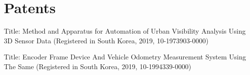 \section{Patents}

\vspace{1mm}
\begin{pubSubsectionNum}{}

    \item Title: Method and Apparatus for Automation of Urban Visibility Analysis Using 3D Sensor Data (Registered in South Korea, 2019, 10-1973903-0000)
    \vspace{-1mm}
    \item Title: Encoder Frame Device And Vehicle Odometry Measurement System Using The Same (Registered in South Korea, 2019, 10-1994339-0000)
    
\end{pubSubsectionNum} 
